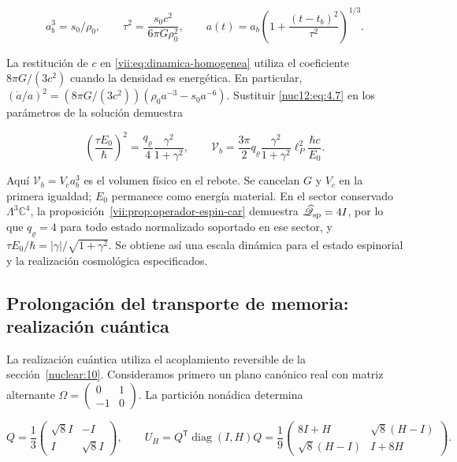 \[
a_b^3=s_0/\rho_0,\qquad
\tau^2=\frac{s_0c^2}{6\pi G\rho_0^2},\qquad
a(t)=a_b\left(1+\frac{(t-t_b)^2}{\tau^2}\right)^{1/3}.
\]



La restitución de \(c\) en \eqref{vii:eq:dinamica-homogenea} utiliza el coeficiente \(8\pi G/(3c^2)\) cuando la densidad es energética. En particular, \((\dot a/a)^2=(8\pi G/(3c^2))(\rho_0a^{-3}-s_0a^{-6})\). Sustituir \eqref{nuc12:eq:4.7} en los parámetros de la solución demuestra



\begin{equation}
\boxed{\left(\frac{\tau E_0}{\hbar}\right)^2
=\frac{q_\varrho}{4}\frac{\gamma^2}{1+\gamma^2},\qquad
\mathcal V_b=\frac{3\pi}{2}q_\varrho
\frac{\gamma^2}{1+\gamma^2}\ell_P^2\frac{\hbar c}{E_0}.}
\label{nuc12:eq:4.8}
\end{equation}



Aquí \(\mathcal V_b=V_c a_b^3\) es el volumen físico en el rebote. Se cancelan \(G\) y \(V_c\) en la primera igualdad; \(E_0\) permanece como energía material. En el sector conservado \(\Lambda^3\mathbb C^4\), la proposición~\ref{vii:prop:operador-espin-car} demuestra \(\widehat{\mathscr Q}_{\rm sp}=4I\), por lo que \(q_\varrho=4\) para todo estado normalizado soportado en ese sector, y
\(\tau E_0/\hbar=|\gamma|/\sqrt{1+\gamma^2}\).
Se obtiene así una escala dinámica para el estado espinorial y la realización cosmológica especificados.

\subsection{Prolongación del transporte de memoria: realización cuántica}

La realización cuántica utiliza el acoplamiento reversible de la sección~\ref{nuclear:10}. Consideramos primero un plano canónico real con matriz alternante \(\Omega=\left(\begin{smallmatrix}0&1\\-1&0\end{smallmatrix}\right)\). La partición nonádica determina



\begin{equation}
Q=\frac13\begin{pmatrix}\sqrt8 I&-I\\I&\sqrt8 I\end{pmatrix},\qquad
U_H=Q^{\mathsf T}\operatorname{diag}(I,H)Q
=\frac19\begin{pmatrix}8I+H&\sqrt8(H-I)\\
\sqrt8(H-I)&I+8H\end{pmatrix}.
\label{nuc12:eq:5.1}
\end{equation}



